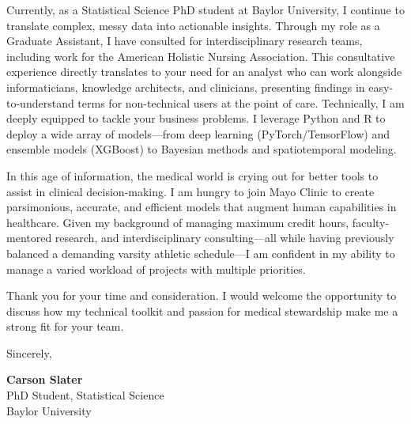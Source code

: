 \documentclass[11pt]{article}
\begin{document}
Currently, as a Statistical Science PhD student at Baylor University, I continue to translate complex, messy data into actionable insights. Through my role as a Graduate Assistant, I have consulted for interdisciplinary research teams, including work for the American Holistic Nursing Association. This consultative experience directly translates to your need for an analyst who can work alongside informaticians, knowledge architects, and clinicians, presenting findings in easy-to-understand terms for non-technical users at the point of care. Technically, I am deeply equipped to tackle your business problems. I leverage Python and R to deploy a wide array of models—from deep learning (PyTorch/TensorFlow) and ensemble models (XGBoost) to Bayesian methods and spatiotemporal modeling.

In this age of information, the medical world is crying out for better tools to assist in clinical decision-making. I am hungry to join Mayo Clinic to create parsimonious, accurate, and efficient models that augment human capabilities in healthcare. Given my background of managing maximum credit hours, faculty-mentored research, and interdisciplinary consulting—all while having previously balanced a demanding varsity athletic schedule—I am confident in my ability to manage a varied workload of projects with multiple priorities.

Thank you for your time and consideration. I would welcome the opportunity to discuss how my technical toolkit and passion for medical stewardship make me a strong fit for your team.

\vspace{1em}
\noindent
Sincerely,

\vspace{1em}
\noindent
\textbf{Carson Slater} \\
PhD Student, Statistical Science \\
Baylor University
\end{document}
